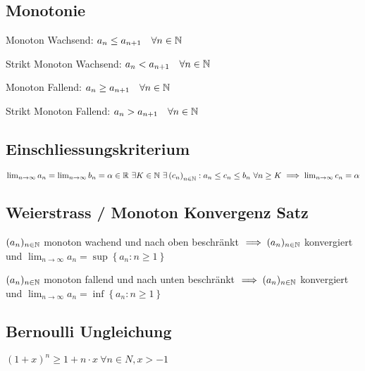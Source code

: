 \subsection{Monotonie}
\begin{compactdesc}
    \item[Monoton Wachsend:] $a_n \le a_{n+1} \quad \forall n \in \mathbb{N}$
    \item[Strikt Monoton Wachsend:] $a_n < a_{n+1} \quad \forall n \in \mathbb{N}$
    \item[Monoton Fallend:] $a_n \ge a_{n+1} \quad \forall n \in \mathbb{N}$
    \item[Strikt Monoton Fallend:] $a_n > a_{n+1} \quad \forall n \in \mathbb{N}$
\end{compactdesc}

\subsection{Einschliessungskriterium}
    $\lim_{n \to \infty} a_n = \lim_{n \to \infty} b_n = \alpha \in \mathbb{R} \ \exists K \in \mathbb{N} \ \exists \left( c_n \right)_{n \in \mathbb{N}}: a_n \le  c_n \le b_n \ \forall n \ge K \implies \lim_{n \to \infty} c_n = \alpha$

\subsection{Weierstrass / Monoton Konvergenz Satz}
\begin{compactitem}
   \item $(a_n)_{n \in \mathbb{N}}$ monoton wachend und nach oben beschränkt $\implies (a_n)_{n \in \mathbb{N}}$ konvergiert und $\lim_{n \to \infty} a_n = \sup \left\{ a_n : n \ge 1 \right\}$
   \item $(a_n)_{n \in \mathbb{N}}$ monoton fallend und nach unten beschränkt $\implies (a_n)_{n \in \mathbb{N}}$ konvergiert und $\lim_{n \to \infty} a_n = \inf \left\{ a_n : n \ge 1 \right\}$
\end{compactitem} 


\subsection{Bernoulli Ungleichung}
$\left( 1 + x \right)^{n} \ge  1 + n \cdot x \ \forall n \in N, x > -1 $

